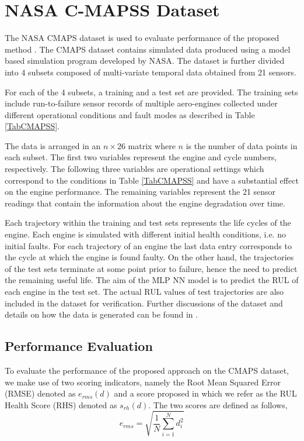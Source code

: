 \documentclass[12pt]{IEEEtran}%
\begin{document}
\section{NASA C-MAPSS Dataset}

\label{sec:rul_dataset}

The NASA CMAPS dataset is used to evaluate performance of the proposed method
\cite{CMAPS2008}. The CMAPS dataset contains simulated data produced using a
model based simulation program developed by NASA. The dataset is further
divided into 4 subsets composed of multi-variate temporal data obtained from
21 sensors.

For each of the 4 subsets, a training and a test set are provided. The training
sets include run-to-failure sensor records of multiple aero-engines collected
under different operational conditions and fault modes as described in Table
\ref{TabCMAPSS}.

The data is arranged in an $n\times26$ matrix where $n$ is the number of data
points in each subset. The first two variables represent the engine and cycle
numbers, respectively. The following three variables are operational settings
which correspond to the conditions in Table \ref{TabCMAPSS} and have a
substantial effect on the engine performance. The remaining variables
represent the 21 sensor readings that contain the information about the engine
degradation over time.

Each trajectory within the training and test sets represents the life cycles
of the engine. Each engine is simulated with different initial health
conditions, i.e. no initial faults. For each trajectory of an engine the last
data entry corresponds to the cycle at which the engine is found faulty. On
the other hand, the trajectories of the test sets terminate at some point
prior to failure, hence the need to predict the remaining useful life. The aim
of the MLP NN model is to predict the RUL of each engine in the test set. The
actual RUL values of test trajectories are also included in the dataset for
verification. Further discussions of the dataset and details on how the data
is generated can be found in \cite{Saxena2008}.

\subsection{Performance Evaluation}

\label{sec:rul_metrics}

To evaluate the performance of the proposed approach on the CMAPS dataset, we
make use of two scoring indicators, namely the Root Mean Squared Error (RMSE)
denoted as $e_{rms}(d)$ and a score proposed in \cite{Saxena2008} which we
refer as the RUL Health Score (RHS) denoted as $s_{rh}(d)$. The two scores are
defined as follows,
\begin{equation}
e_{rms} = \sqrt{ \frac{1}{N} \sum_{i=1}^{N}{d_{i}^{2}}} \label{eq:rmse}%
\end{equation}
%
\end{document}
